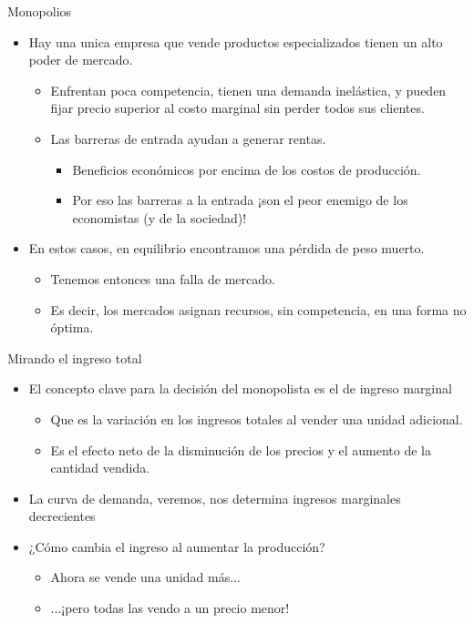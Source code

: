 \documentclass{beamer}
\begin{document}
\begin{frame}{Monopolios}
    \begin{itemize}
        \item Hay una unica empresa que vende productos especializados tienen un alto poder de mercado.
        \begin{itemize}
            \item Enfrentan poca competencia, tienen una demanda inelástica, y pueden fijar precio superior al costo marginal sin perder todos sus clientes.
            \item Las barreras de entrada ayudan a generar rentas.
            \begin{itemize}
                \item Beneficios económicos por encima de los costos de producción.
                \item Por eso las barreras a la entrada ¡son el peor enemigo de los economistas (y de la sociedad)!
            \end{itemize}
        \end{itemize}
        \item En estos casos, en equilibrio encontramos una pérdida de peso muerto.
        \begin{itemize}
            \item Tenemos entonces una falla de mercado.
            \item Es decir, los mercados asignan recursos, sin competencia, en una forma no óptima.
        \end{itemize}
    \end{itemize}
\end{frame}


\begin{frame}{Mirando el ingreso total}
    \begin{itemize}
        \item El concepto clave para la decisión del monopolista es el de ingreso marginal
        \begin{itemize}
            \item Que es la variación en los ingresos totales al vender una unidad adicional.
            \item Es el efecto neto de la disminución de los precios y el aumento de la cantidad vendida.
        \end{itemize}
        \item La curva de demanda, veremos, nos determina ingresos marginales decrecientes
        
        \item ¿Cómo cambia el ingreso al aumentar la producción?
        \begin{itemize}
            \item Ahora se vende una unidad más...
            \item ...¡pero todas las vendo a un precio menor!
        \end{itemize}
    \end{itemize}
\end{frame}
\end{document}
